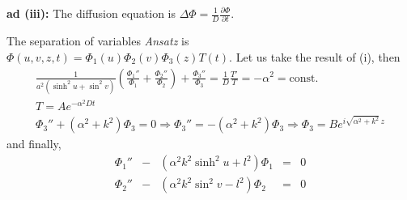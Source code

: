 {{\bf ad (iii):}
The diffusion equation is
$\Delta\Phi=\frac{1}{D}\frac{\partial \Phi}{\partial t}$.

The separation of variables {\it Ansatz} is  $\Phi(u,v,z,t)=\Phi_1(u)\Phi_2(v)\Phi_3(z)T(t)$.
Let us take the result of (i), then
\begin{equation}
\begin{array}  {l}
  \frac{1}{a^2(\sinh^2u+\sin^2v)}
  \left(
    \frac{\Phi_1''}{\Phi_1}+
    \frac{\Phi_2''}{\Phi_2}
  \right)+\frac{\Phi_3''}{\Phi_3}=\frac{1}{D}\frac{T'}{T}=
    -\alpha^2=\mbox{const.}
\\
  T=Ae^{-\alpha^2Dt}
\\
  \Phi_3''+(\alpha^2+k^2)\Phi_3=0
  \Longrightarrow
  \Phi_3''=-(\alpha^2+k^2)\Phi_3
  \Longrightarrow
  \Phi_3=Be^{i\sqrt{\alpha^2+k^2} \, z}
\end{array}
\end{equation}
and finally,
$$
  \begin{array}{rcccl}
    \Phi_1'' & - & (\alpha^2k^2\sinh^2u+l^2)\Phi_1 & = & 0 \\[1ex]
    \Phi_2'' & - & (\alpha^2k^2\sin^2v-l^2)\Phi_2 & = & 0
  \end{array}
$$


\eexample
}



\begin{center}
{\color{olive}   \Huge
\leafleft
}
\end{center}

